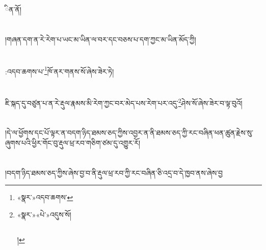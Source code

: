 ིན་ནོ།\chapter{ }།གཞན་དག་ན་རེ་རེག་པ་ཡང་མ་ཡིན་ལ་བར་དང་བཅས་པ་དག་ཀྱང་མ་ཡིན་མོད་ཀྱི།\chapter{ }:འདབ་ཆགས་པ་\footnote{«སྣར་»འདབ་ཆགས་}ཁོ་ནར་གནས་སོ་ཞེས་ཟེར་ཏེ།\chapter{ }ཇི་སྐད་དུ་བཙུན་པ་ན་རེ་རྡུལ་རྣམས་མི་རེག་ཀྱང་བར་མེད་པས་རེག་པར་འདུ་\footnote{«སྣར་»«པེ་»འདུས་སོ།\chapter{ }།}ཤེས་སོ་ཞེས་ཟེར་བ་ལྟ་བུའོ།\chapter{ }།དེ་ལ་ཕྱོགས་དང་པོ་ལྟར་ན་བདག་ཉིད་ཐམས་ཅད་ཀྱིས་འབྱར་ན་ནི་ཐམས་ཅད་ཀྱི་རང་བཞིན་ཕན་ཚུན་རྗེས་སུ་ཞུགས་པའི་ཕྱིར་གོང་བུ་རྡུལ་ཕྲ་རབ་གཅིག་ཙམ་དུ་འགྱུར་རོ།\chapter{ }།བདག་ཉིད་ཐམས་ཅད་ཀྱིས་ཞེས་བྱ་བ་ནི་རྡུལ་ཕྲ་རབ་ཀྱི་རང་བཞིན་ཅི་འདྲ་བ་དེ་ཁྱབ་ནས་ཞེས་བྱ